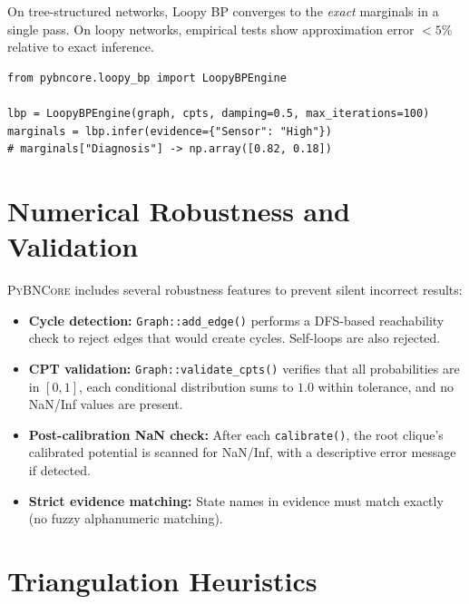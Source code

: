 \documentclass[11pt, letterpaper]{article}
\newcommand{\bncore}{\textsc{PyBNCore}}
\theoremstyle{definitionstyle}
\begin{document}
On tree-structured networks, Loopy BP converges to the \emph{exact} marginals
in a single pass. On loopy networks, empirical tests show approximation
error $<5\%$ relative to exact inference.

\begin{lstlisting}[style=pythonstyle, caption={Loopy BP API}]
from pybncore.loopy_bp import LoopyBPEngine

lbp = LoopyBPEngine(graph, cpts, damping=0.5, max_iterations=100)
marginals = lbp.infer(evidence={"Sensor": "High"})
# marginals["Diagnosis"] -> np.array([0.82, 0.18])
\end{lstlisting}


\section{Numerical Robustness and Validation}
\label{sec:robustness}

\bncore{} includes several robustness features to prevent silent incorrect
results:

\begin{itemize}[nosep]
  \item \textbf{Cycle detection:} \texttt{Graph::add\_edge()} performs a
    DFS-based reachability check to reject edges that would create cycles.
    Self-loops are also rejected.
  \item \textbf{CPT validation:} \texttt{Graph::validate\_cpts()} verifies
    that all probabilities are in $[0,1]$, each conditional distribution
    sums to $1.0$ within tolerance, and no NaN/Inf values are present.
  \item \textbf{Post-calibration NaN check:} After each \texttt{calibrate()},
    the root clique's calibrated potential is scanned for NaN/Inf, with a
    descriptive error message if detected.
  \item \textbf{Strict evidence matching:} State names in evidence must match
    exactly (no fuzzy alphanumeric matching).
\end{itemize}


\section{Triangulation Heuristics}
\label{sec:heuristics}
\end{document}
